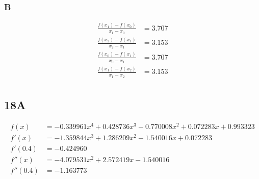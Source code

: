\documentclass{oisinclass}
\begin{document}
\subsubsection*{B}
\begin{align*}
	\frac{f(x_1) - f(x_0)}{x_1 - x_0} & = 3.707 \\
	\frac{f(x_2) - f(x_1)}{x_2 - x_1} & = 3.153 \\[3.5ex]
	\frac{f(x_0) - f(x_1)}{x_0 - x_1} & = 3.707 \\
	\frac{f(x_1) - f(x_2)}{x_1 - x_2} & = 3.153 \\
\end{align*}

\subsection*{18A}
\begin{align*}
	f(x)     & = - 0.339961 x^{4} + 0.428736 x^{3} - 0.770008 x^{2} + 0.072283 x + 0.993323 \\
	f'(x)    & = - 1.359844 x^{3} + 1.286209 x^{2} - 1.540016 x + 0.072283                  \\
	f'(0.4)  & = -0.424960                                                                  \\
	f''(x)   & = - 4.079531 x^{2} + 2.572419 x - 1.540016                                   \\
	f''(0.4) & = -1.163773                                                                  \\
\end{align*}
\end{document}
